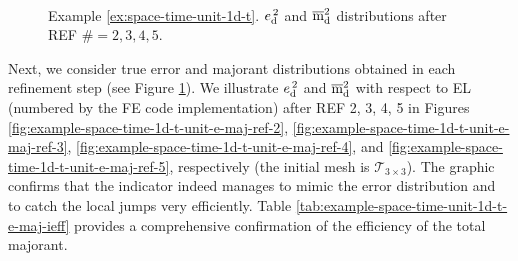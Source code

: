 \begin{example}
\begin{figure}[!ht]
	\centering
	\\
	\;
	\caption{Example \ref{ex:space-time-unit-1d-t}. 
	${e}^{\,2}_{\mathrm{d}}$ and $\overline{\mathrm m}^2_{\mathrm{d}}$ distributions after REF $\# = 2, 3, 4, 5$.}
	\label{fig:example-space-time-1d-t-unit-e-maj-distr}
\end{figure}

Next, we consider true error and majorant distributions obtained in each refinement 
step (see Figure \ref{fig:example-space-time-1d-t-unit-e-maj-distr}). We illustrate 
${e}^{\,2}_{\mathrm{d}}$ and $\overline{\mathrm m}^2_{\mathrm{d}}$ with respect to EL (numbered by the FE code implementation) 
after REF 2, 3, 4, 5 in Figures \ref{fig:example-space-time-1d-t-unit-e-maj-ref-2}, 
\ref{fig:example-space-time-1d-t-unit-e-maj-ref-3}, 
\ref{fig:example-space-time-1d-t-unit-e-maj-ref-4}, and 
\ref{fig:example-space-time-1d-t-unit-e-maj-ref-5}, respectively (the initial mesh
is $\mathcal{T}_{3 \times 3}$). The graphic confirms
that the indicator indeed manages to mimic the error distribution and to catch the 
local jumps 
very efficiently. Table \ref{tab:example-space-time-unit-1d-t-e-maj-ieff} provides
a comprehensive confirmation of the efficiency of the total majorant.  


\end{example}
